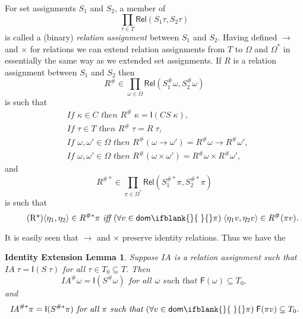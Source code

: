 \documentclass[sigplan,screen,nonacm,balance=false]{acmart}
\theoremstyle{plain}
\DeclarePairedDelimiter{\pair}{\langle}{\rangle}
\newcommand{\dom}[1]{\mathsf{dom}\ifblank{#1}{\;}{#1}}
\newcommand{\FV}{\mathsf{F}}
\newcommand{\CS}{\mathit{CS}}
\newcommand{\IA}{\mathit{IA}}
\newcommand{\Rel}{\mathsf{Rel}}
\newcommand{\Id}{\mathsf{I}}
\begin{document}
For set assignments $S_1$ and $S_2$, a member of
%
\begin{equation*}
  \prod_{\tau \in T} \Rel(S_1 \tau, S_2 \tau)
\end{equation*}
%
is called a (binary) \emph{relation assignment} between $S_1$ and $S_2$.
Having defined $\to$ and $\times$ for relations we can extend relation assignments from $T$ to $\Omega$ and $\Omega^*$ in essentially the same way as we extended set assignments.
If $R$ is a relation assignment between $S_1$ and $S_2$ then
%
\begin{equation*}
  R^\# \in \prod_{\omega \in \Omega} \Rel(S_1^\# \omega, S_2^\# \omega)
\end{equation*}
%
is such that
%
\begin{align}
  \tag{R1}
  &\textit{If } \kappa \in C  \textit{ then } R^\# \; \kappa = \Id(\CS \; \kappa), \\
  \tag{R2}
  &\textit{If } \tau \in T  \textit{ then } R^\# \; \tau = R \; \tau, \\
  \tag{R3}
  &\textit{If } \omega, \omega' \in \Omega \textit{ then } R^\#(\omega \to \omega') = R^\# \omega \to R^\# \omega', \\
  \tag{R4}
  &\textit{If } \omega, \omega' \in \Omega \textit{ then } R^\#(\omega \times \omega') = R^\# \omega \times R^\# \omega',
\end{align}
%
and
%
\begin{equation*}
  R^{\#*} \in \prod_{\pi \in \Omega^*} \Rel(S_1^{\#*} \pi, S_2^{\#*} \pi)
\end{equation*}
%
is such that
%
\begin{equation}
  \tag{R*}
  \pair{\eta_1, \eta_2} \in R^{\#*} \pi \textit{ iff } (\forall v \in \dom{} \pi) \; \pair{\eta_1 v, \eta_2 v} \in R^\#(\pi v).
\end{equation}

It is easily seen that $\to$ and $\times$ preserve identity relations.
Thus we have the

\newtheorem*{IEL}{Identity Extension Lemma}
\begin{IEL}
  Suppose $\IA$ is a relation assignment such that $\IA \; \tau = \Id(S \; \tau)$ for all $\tau \in T_0 \subseteq T$. Then
  \begin{equation*}
    \IA^\# \omega = \Id(S^\# \omega) \textit{ for all } \omega \textit{ such that } \FV(\omega) \subseteq T_0,
  \end{equation*}
  and
  \begin{equation*}
    \IA^{\#*} \pi = \Id(S^{\#*} \pi) \textit{ for all } \pi \textit{ such that } (\forall v \in \dom{} \pi) \; \FV(\pi v) \subseteq T_0.
  \end{equation*}
\end{IEL}
\end{document}
